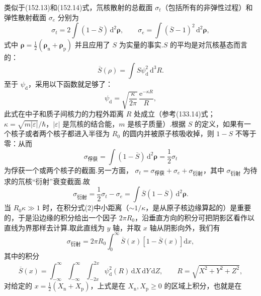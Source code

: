 \begin{xiti}
类似于(152.13)和(152.14)式，氘核散射的总截面 $\sigma_t$（包括所有的非弹性过程）和弹性散射截面 $\sigma_e$ 分别为
\begin{equation*}
  \sigma_t=2\int(1-\overline{S})\,\mathrm{d}^2\boldsymbol{\rho},\qquad
  \sigma_e=\int(\overline{S}-1)^2\,\mathrm{d}^2\boldsymbol{\rho},
\end{equation*}
式中 $\boldsymbol{\rho}=\frac{1}{2}(\boldsymbol{\rho}_{\mathrm{n}}+\boldsymbol{\rho}_{\mathrm{p}})$
并且应用了 $S$ 为实量的事实.$S$ 的平均是对氘核基态而言的：
\begin{equation*}
  \overline{S}(\rho)=\int S\psi_{\mathrm{d}}^2\,\mathrm{d}^3R.
\end{equation*}
至于 $\psi_{\mathrm{d}}$，采用以下函数就足够了：
\begin{equation*}
  \psi_{\mathrm{d}}=\sqrt{\frac{\kappa}{2\pi}}\,\frac{\mathrm{e}^{-\kappa R}}{R},
\end{equation*}
此式在中子和质子间核力的力程外距离 $R$ 处成立（参考(133.14)式；
$\kappa=\sqrt{m|\varepsilon|}/\hbar$，$|\varepsilon|$ 是氘核的结合能，$m$ 是核子质量）.根据 $S$ 的定义，如果有一个核子或者两个核子都进入半径为 $R_0$ 的圆内并被原子核吸收掉，则 $1-S$ 不等于零：从而
\setcounter{equation}{0}%
\begin{equation}
  \sigma_{\text{俘获}}=\int(1-\overline{S})\,\mathrm{d}^2\boldsymbol{\rho}
  =\frac{1}{2}\sigma_t
\end{equation}
为俘获一个或两个核子的截面.另一方面，
$\sigma_t=\sigma_{\text{俘获}}+\sigma_e+\sigma_{\text{衍射}}$，其中
$\sigma_{\text{衍射}}$ 为待求的氘核“衍射”衰变截面.故
\begin{equation}
  \sigma_{\text{衍射}}=\frac{1}{2}\sigma_t-\sigma_e
  =\int\overline{S}(1-\overline{S})\,\mathrm{d}^2\boldsymbol{\rho}.
\end{equation}
当 $R_0\kappa\gg1$ 时，在积分式(2)中小距离（$\sim1/\kappa$，是从原子核边缘算起的）是重要的，于是沿边缘的积分给出一个因子 $2\pi R_0$，沿垂直方向的积分可把阴影区看作以直线为界那样去计算.取此直线为 $y$ 轴，并取 $x$ 轴从阴影向外，我们有
\begin{equation*}
  \sigma_{\text{衍射}}=2\pi R_0\int_0^{\infty}\overline{S}(x)
  \left[1-\overline{S}(x)\right]\mathrm{d}x,
\end{equation*}
其中的积分
\begin{equation*}
  \overline{S}(x)=\int_{-\infty}^{\infty}\int_{-\infty}^{\infty}\int_{-2x}^{2x}
  \psi_{\mathrm{d}}^2(R)\,\mathrm{d}X\,\mathrm{d}Y\,\mathrm{d}Z,\qquad
  R=\sqrt{X^2+Y^2+Z^2},
\end{equation*}
对给定的 $x=\frac{1}{2}(X_{\mathrm{n}}+X_{\mathrm{p}})$，上式是在 $X_{\mathrm{n}},X_{\mathrm{p}}\geqslant0$ 的区域上积分，也就是在

\end{xiti}
